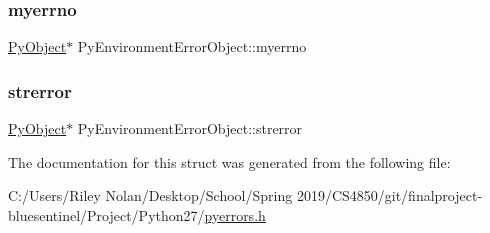 \mbox{\label{struct_py_environment_error_object_a6a6b5fde89a772bdee37a9115e64bd51}} 
\subsubsection{\texorpdfstring{myerrno}{myerrno}}
{\footnotesize\ttfamily \mbox{\hyperlink{_python27_2object_8h_aadc84ac7aed2cfa6f20c25f62bf3dac7}{Py\+Object}}$\ast$ Py\+Environment\+Error\+Object\+::myerrno}

\mbox{\label{struct_py_environment_error_object_a9df2fa55af8191a1052cc425466ffb0c}} 
\subsubsection{\texorpdfstring{strerror}{strerror}}
{\footnotesize\ttfamily \mbox{\hyperlink{_python27_2object_8h_aadc84ac7aed2cfa6f20c25f62bf3dac7}{Py\+Object}}$\ast$ Py\+Environment\+Error\+Object\+::strerror}



The documentation for this struct was generated from the following file\+:\begin{DoxyCompactItemize}
\item 
C\+:/\+Users/\+Riley Nolan/\+Desktop/\+School/\+Spring 2019/\+C\+S4850/git/finalproject-\/bluesentinel/\+Project/\+Python27/\mbox{\hyperlink{pyerrors_8h}{pyerrors.\+h}}\end{DoxyCompactItemize}
